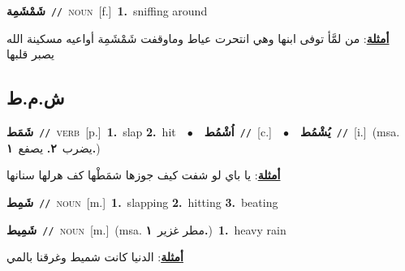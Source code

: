 \documentclass[10pt,a4paper,twoside]{article} %
\begin{document}
\begin{multicols}{2}
{\setlength\topsep{0pt}\textbf{\foreignlanguage{arabic}{شَمْشَمِة}}\ {\color{gray}\texttt{//}\color{black}}\ \textsc{noun}\ [f.]\ \textbf{1.}~sniffing around\  \begin{flushright}\color{gray}\foreignlanguage{arabic}{\textbf{\underline{\foreignlanguage{arabic}{أمثلة}}}: من لمَّأ توفى ابنها وهي انتحرت عياط وماوقفت شَمْشَمِة أواعيه مسكينة الله يصبر قلبها}\end{flushright}\color{black}} \vspace{2mm}

\vspace{-3mm}
\subsection*{\color{blue}\foreignlanguage{arabic}{ش.م.ط}\color{blue}{}} 

{\setlength\topsep{0pt}\textbf{\foreignlanguage{arabic}{شَمَط}}\ {\color{gray}\texttt{//}\color{black}}\ \textsc{verb}\ [p.]\ \textbf{1.}~slap  \textbf{2.}~hit\ \ $\bullet$\ \ \setlength\topsep{0pt}\textbf{\foreignlanguage{arabic}{اُشْمُط}}\ {\color{gray}\texttt{//}\color{black}}\ [c.]\ \ $\bullet$\ \ \setlength\topsep{0pt}\textbf{\foreignlanguage{arabic}{يُشْمُط}}\ {\color{gray}\texttt{//}\color{black}}\ [i.]\ \color{gray}(msa. \foreignlanguage{arabic}{يضرب}~\foreignlanguage{arabic}{\textbf{٢.}}  \foreignlanguage{arabic}{يصفع}~\foreignlanguage{arabic}{\textbf{١.}})\color{black}\  \begin{flushright}\color{gray}\foreignlanguage{arabic}{\textbf{\underline{\foreignlanguage{arabic}{أمثلة}}}: يا باي لو شفت كيف جوزها شمَطْها كف هرلها سنانها}\end{flushright}\color{black}} \vspace{2mm}

{\setlength\topsep{0pt}\textbf{\foreignlanguage{arabic}{شَمِط}}\ {\color{gray}\texttt{//}\color{black}}\ \textsc{noun}\ [m.]\ \textbf{1.}~slapping  \textbf{2.}~hitting  \textbf{3.}~beating\ } \vspace{2mm}

{\setlength\topsep{0pt}\textbf{\foreignlanguage{arabic}{شَمِيط}}\ {\color{gray}\texttt{//}\color{black}}\ \textsc{noun}\ [m.]\ \color{gray}(msa. \foreignlanguage{arabic}{مطر غزير}~\foreignlanguage{arabic}{\textbf{١.}})\color{black}\ \textbf{1.}~heavy rain\  \begin{flushright}\color{gray}\foreignlanguage{arabic}{\textbf{\underline{\foreignlanguage{arabic}{أمثلة}}}: الدنيا كانت شميط وغرقنا بالمي}\end{flushright}\color{black}} \vspace{2mm}


\end{multicols}
\end{document}
